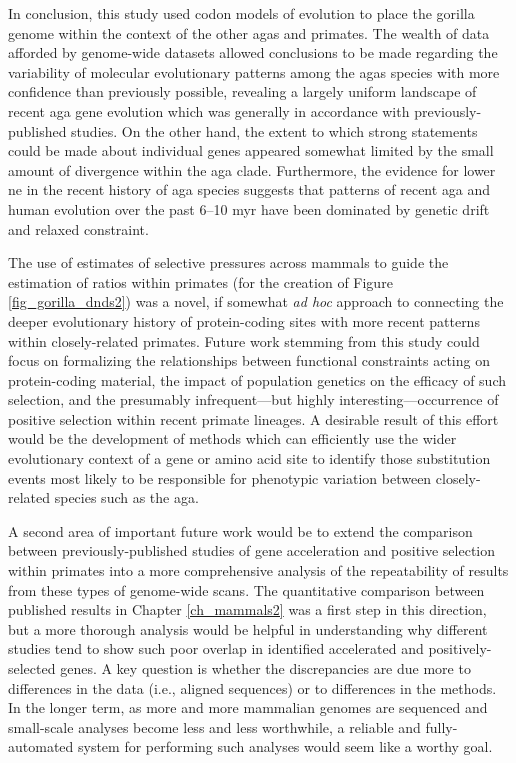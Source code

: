 In conclusion, this study used codon models of evolution to place the
gorilla genome within the context of the other \acp{aga} and
primates. The wealth of data afforded by genome-wide datasets allowed
conclusions to be made regarding the variability of molecular
evolutionary patterns among the \acp{aga} species with more confidence
than previously possible, revealing a largely uniform landscape of
recent \ac{aga} gene evolution which was generally in accordance with
previously-published studies. On the other hand, the extent to which
strong statements could be made about individual genes appeared
somewhat limited by the small amount of divergence within the \ac{aga}
clade. Furthermore, the evidence for lower \ac{ne} in the recent
history of \ac{aga} species suggests that patterns of recent \ac{aga}
and human evolution over the past 6--10 \ac{myr} have been dominated
by genetic drift and relaxed constraint.

The use of \sw estimates of selective pressures across mammals to
guide the estimation of \dnds ratios within primates (for the creation
of Figure \ref{fig_gorilla_dnds2}) was a novel, if somewhat \emph{ad
  hoc} approach to connecting the deeper evolutionary history of
protein-coding sites with more recent patterns within closely-related
primates. Future work stemming from this study could focus on
formalizing the relationships between functional constraints acting on
protein-coding material, the impact of population genetics on the
efficacy of such selection, and the presumably infrequent---but highly
interesting---occurrence of positive selection within recent primate
lineages. A desirable result of this effort would be the development
of methods which can efficiently use the wider evolutionary context of
a gene or amino acid site to identify those substitution events most
likely to be responsible for phenotypic variation between
closely-related species such as the \ac{aga}.

A second area of important future work would be to extend the
comparison between previously-published studies of gene acceleration
and positive selection within primates into a more comprehensive
analysis of the repeatability of results from these types of
genome-wide scans. The quantitative comparison between published
results in Chapter \ref{ch_mammals2} was a first step in this
direction, but a more thorough analysis would be helpful in
understanding why different studies tend to show such poor overlap in
identified accelerated and positively-selected genes. A key question
is whether the discrepancies are due more to differences in the data
(i.e., aligned sequences) or to differences in the methods. In the
longer term, as more and more mammalian genomes are sequenced and
small-scale analyses become less and less worthwhile, a reliable and
fully-automated system for performing such analyses would seem like a
worthy goal.
